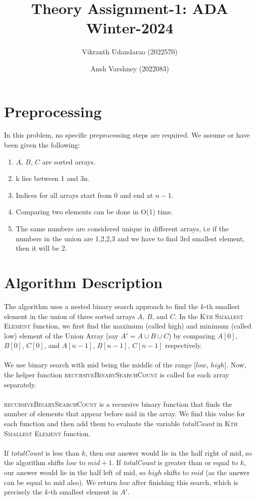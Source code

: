 \documentclass{article}
\title{Theory Assignment-1: ADA Winter-2024}
\author{Vikranth Udandarao (2022570) \and Ansh Varshney (2022083)}
\date{}
\begin{document}
\maketitle


\section{Preprocessing}
In this problem, no specific preprocessing steps are required. We assume or have been given the following:
\begin{enumerate}
    \item $A$, $B$, $C$ are sorted arrays.
    \item k lies between 1 and 3n.
    \item Indices for all arrays start from 0 and end at $n-1$.
    \item Comparing two elements can be done in O(1) time.
    \item The same numbers are considered unique in different arrays, i.e if the numbers in the union are 1,2,2,3 and we have to find 3rd smallest element, then it will be 2.
\end{enumerate}


\section{Algorithm Description}
The algorithm uses a nested binary search approach to find the $k$-th smallest element in the union of three sorted arrays $A$, $B$, and $C$. In the \textsc{Kth Smallest Element} function, we first find the maximum (called high) and minimum (called low) element of the Union Array (say $A' = A \cup B \cup C$) by comparing $A[0]$, $B[0]$, $C[0]$, and $A[n-1]$, $B[n-1]$, $C[n-1]$ respectively.
\\\\
We use binary search with mid being the middle of the range [$low$, $high$]. Now, the helper function \textsc{recursiveBinarySearchCount} is called for each array separately.
\\\\
\textsc{recursiveBinarySearchCount} is a recursive binary function that finds the number of elements that appear before mid in the array. We find this value for each function and then add them to evaluate the variable \textit{totalCount} in \textsc{Kth Smallest Element} function.
\\\\
If \textit{totalCount} is less than $k$, then our answer would lie in the half right of mid, so the algorithm shifts $low$ to $mid+1$. If \textit{totalCount} is greater than or equal to $k$, our answer would lie in the half left of mid, so $high$ shifts to $mid$ (as the answer can be equal to mid also). We return $low$ after finishing this search, which is precisely the $k$-th smallest element in $A'$.
\end{document}
